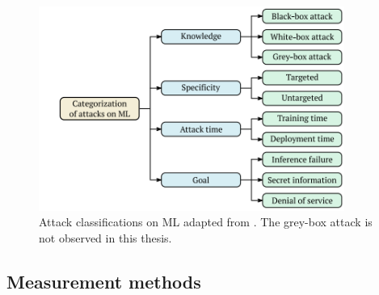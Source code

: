 \begin{figure}[ht!]
  \centering
  \includegraphics[width=10cm]{pictures/classifi_attacks_ml.png}
  \caption{Attack classifications on ML adapted from \cite{DBLP:journals/corr/abs-2012-04884}. The grey-box attack is not observed in this thesis.}
  \label{fig:classifi_attacks_ml}
\end{figure}

\subsection{Measurement methods}

